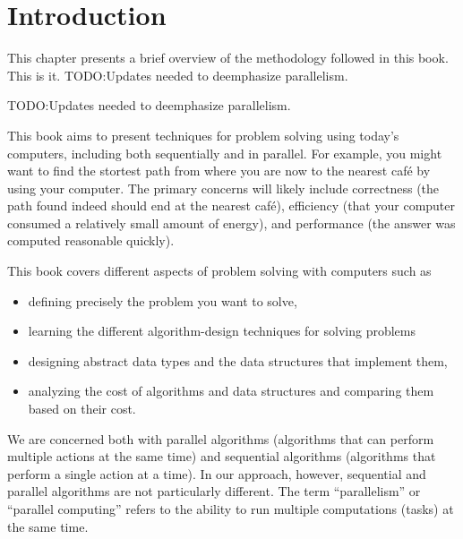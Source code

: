 \chapter{Introduction}This chapter presents a brief overview of the methodology followed in
this book.
This is it.
TODO:Updates needed to deemphasize parallelism.

TODO:Updates needed to deemphasize parallelism.

This book aims to present techniques for problem solving using today's
computers, including both sequentially and in parallel.
%
For example, you might want to find the stortest path from where you
are now to the nearest caf\'e by using your computer.
%
The primary concerns will likely include correctness (the path found
indeed should end at the nearest caf\'e), 
%
efficiency (that your computer consumed a relatively small amount of
energy), and performance (the answer was computed reasonable quickly).
%

This book covers different aspects of problem solving with computers
such as 
\begin{itemize}
\item defining precisely the problem you want to solve,
\item learning the different algorithm-design techniques for solving problems
\item designing abstract data types and the data structures that
  implement them,
%
\item analyzing the cost of algorithms and data structures and
  comparing them based on their cost.
%
\end{itemize}

We are concerned both with 
%
parallel algorithms (algorithms that can perform multiple actions at
the same time)
%
and 
%
sequential algorithms (algorithms that perform a single action at a
time).
%
In our approach, however, sequential and parallel algorithms are not
particularly different.
%
The term ``parallelism'' or ``parallel computing'' refers to the
ability to run multiple computations (tasks) at the same time.
%

